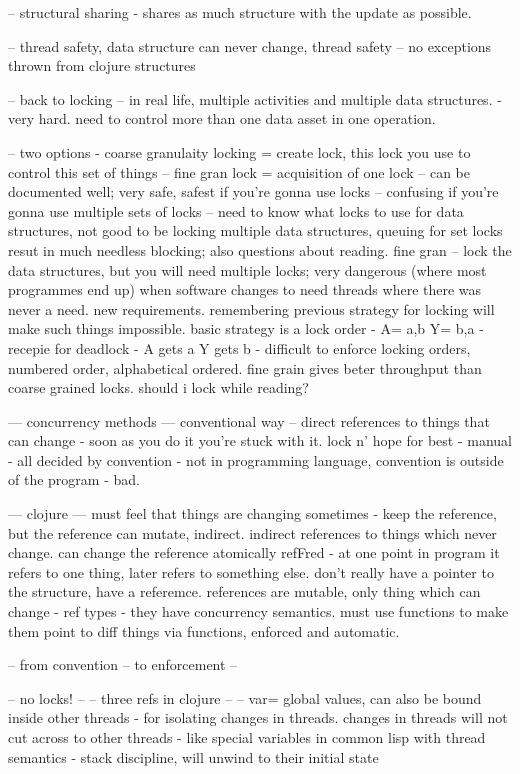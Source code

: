 \documentclass[12pt,a4paper]{article}
\begin{document}
-- structural sharing - shares as much structure with the update as possible. 

-- thread safety, data structure can never change, thread safety -- no exceptions thrown from clojure structures


-- back to locking --
in real life, multiple activities and multiple data structures. - very hard. need to control more than one data asset in one operation.

-- two options - coarse granulaity locking = create lock, this lock you use to control this set of things
-- fine gran lock = acquisition of one lock -- can be documented well; very safe, safest if you're gonna use locks -- confusing if you're gonna use multiple sets of locks -- need to know what locks to use for data structures, not good to be locking multiple data structures, queuing for set locks resut in much needless blocking; also questions about reading. fine gran -- lock the data structures, but you will need multiple locks; very dangerous (where most programmes end up) when software changes to need threads where there was never a need. new requirements. remembering previous strategy for locking will make such things impossible. basic strategy is a lock order - A= a,b Y= b,a - recepie for deadlock - A gets a Y gets b - difficult to enforce locking orders, numbered order, alphabetical ordered. fine grain gives beter throughput than coarse grained locks. should i lock while reading?

--- concurrency methods ---
conventional way -- direct references to things that can change - soon as you do it you're stuck with it. lock n' hope for best - manual - all decided by convention - not in programming language, convention is outside of the program - bad.


--- clojure ---
must feel that things are changing sometimes - keep the reference, but the reference can mutate, indirect. indirect references to things which never change. can change the reference atomically refFred - at one point in program it refers to one thing, later refers to something else. don't really have a pointer to the structure, have a referemce. references are mutable, only thing which can change - ref types - they have concurrency semantics. must use functions to make them point to diff things via functions, enforced and automatic. 

-- from convention -- to enforcement --

-- no locks! --
-- three refs in clojure --
-- var= global values, can also be bound inside other threads - for isolating changes in threads. changes in threads will not cut across to other threads - like special variables in common lisp with thread semantics - stack discipline, will unwind to their initial state
\end{document}
